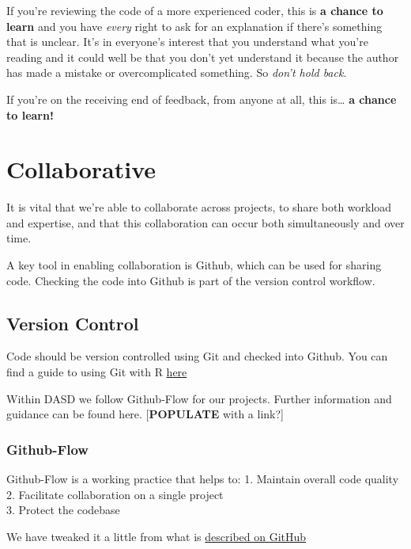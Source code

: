 \documentclass[]{book}
\begin{document}
If you're reviewing the code of a more experienced coder, this is \textbf{a chance to learn} and you have \emph{every} right to ask for an explanation if there's something that is unclear. It's in everyone's interest that you understand what you're reading and it could well be that you don't yet understand it because the author has made a mistake or overcomplicated something. So \emph{don't hold back}.

If you're on the receiving end of feedback, from anyone at all, this is\ldots{} \textbf{a chance to learn!}

\hypertarget{collaborate}{%
\chapter{Collaborative}\label{collaborate}}

It is vital that we're able to collaborate across projects, to share both workload and expertise, and that this collaboration can occur both simultaneously and over time.

A key tool in enabling collaboration is Github, which can be used for sharing code. Checking the code into Github is part of the version control workflow.

\hypertarget{versioncontrol}{%
\section{Version Control}\label{versioncontrol}}

Code should be version controlled using Git and checked into Github.
You can find a guide to using Git with R \href{http://happygitwithr.com/}{here}

Within DASD we follow Github-Flow for our projects. Further information and guidance can be found here. {[}\textbf{POPULATE} with a link?{]}

\hypertarget{flow}{%
\subsection*{Github-Flow}\label{flow}}

Github-Flow is a working practice that helps to:
1. Maintain overall code quality\\
2. Facilitate collaboration on a single project\\
3. Protect the codebase

We have tweaked it a little from what is \href{https://guides.github.com/introduction/flow/}{described on GitHub}
\end{document}
